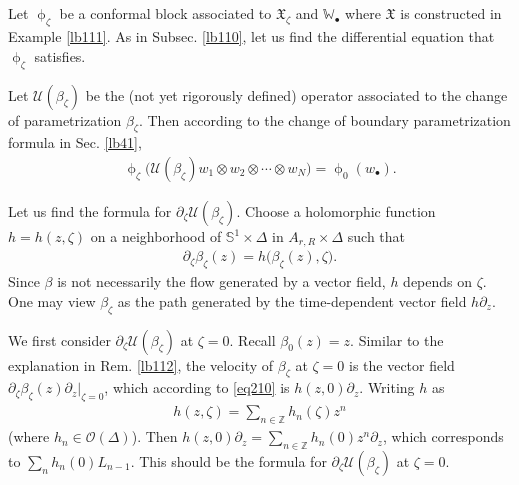 \documentclass[11pt,b5paper,notitlepage]{article}
\theoremstyle{definition}
\theoremstyle{plain}
\newcommand{\fk}{\mathfrak}
\newcommand{\mc}{\mathcal}
\newcommand{\scr}{\mathscr}
\newcommand{\blt}{\bullet}
\newcommand{\Wbb}{\mathbb W}
\newcommand{\Zbb}{\mathbb Z}
\newcommand{\Sbb}{{\mathbb S}}
\numberwithin{equation}{section}
\begin{document}
\subsection{}\label{lb116}

Let $\upphi_\zeta$ be a conformal block associated to $\fk X_\zeta$ and $\Wbb_\blt$ where $\fk X$ is constructed in Example \ref{lb111}. As in Subsec. \ref{lb110}, let us find the differential equation that $\upphi_\zeta$ satisfies.

Let $\mc U(\beta_\zeta)$ be the (not yet rigorously defined) operator associated to the change of parametrization $\beta_\zeta$. Then according to the change of boundary parametrization formula in Sec. \ref{lb41}, 
\begin{align}
\upphi_\zeta\big(\mc U(\beta_\zeta)w_1\otimes w_2\otimes\cdots\otimes w_N\big)=\upphi_0(w_\blt).\label{eq211}
\end{align}

Let us find the formula for $\partial_\zeta\mc U(\beta_\zeta)$. Choose a holomorphic function $h=h(z,\zeta)$ on a neighborhood of $\Sbb^1\times\Delta$ in $A_{r,R}\times\Delta$ such that 
\begin{align}
\partial_\zeta\beta_\zeta(z)=h\big(\beta_\zeta(z),\zeta\big).\label{eq210}
\end{align}
Since $\beta$ is not necessarily the flow generated by a vector field, $h$ depends on $\zeta$. One may view $\beta_\zeta$ as the path generated by the time-dependent vector field $h\partial_z$.

We first consider $\partial_\zeta\mc U(\beta_\zeta)$ at $\zeta=0$. Recall $\beta_0(z)=z$. Similar to the explanation in Rem. \ref{lb112}, the velocity of $\beta_\zeta$ at $\zeta=0$ is the vector field $\partial_\zeta\beta_\zeta(z)\partial_z\big|_{\zeta=0}$, which according to \eqref{eq210} is $h(z,0)\partial_z$. Writing $h$ as
\begin{align}
h(z,\zeta)=\sum_{n\in\Zbb}h_n(\zeta)z^n\label{eq216}
\end{align}
(where $h_n\in\scr O(\Delta)$). Then $h(z,0)\partial_z=\sum_{n\in\Zbb}h_n(0)z^n\partial_z$, which corresponds to $\sum_n h_n(0)L_{n-1}$. This should be the formula for $\partial_\zeta \mc U(\beta_\zeta)$ at $\zeta=0$.
\end{document}
